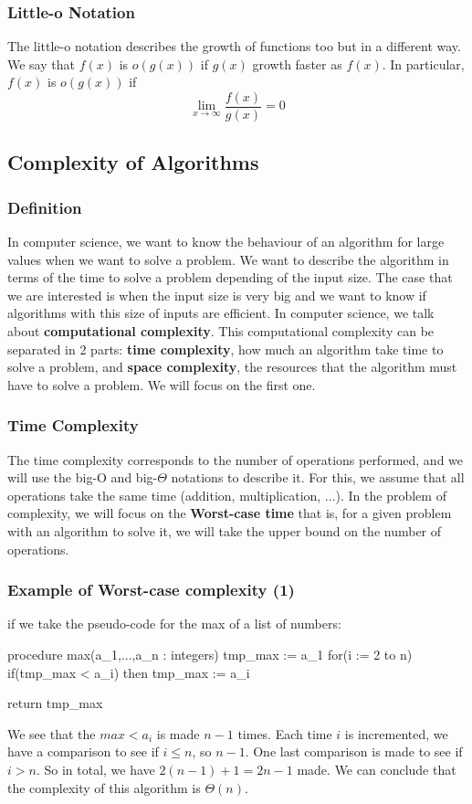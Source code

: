 \documentclass{article}
\begin{document}
\subsubsection{Little-o Notation} The little-o notation describes the growth of functions too but in a different way. We say that $ f(x) $ is $ o(g(x)) $ if $ g(x) $ growth faster as $ f(x) $. In particular, $ f(x) $ is $ o(g(x)) $ if
\begin{equation}
\lim_{x \rightarrow \infty}\frac{f(x)}{g(x)} = 0
\end{equation}

\subsection{Complexity of Algorithms}
\subsubsection{Definition} In computer science, we want to know the behaviour of an algorithm for large values when we want to solve a problem. We want to describe the algorithm in terms of the time to solve a problem depending of the input size. The case that we are interested is when the input size is very big and we want to know if algorithms with this size of inputs are efficient. In computer science, we talk about \textbf{computational complexity}. This computational complexity can be separated in 2 parts: \textbf{time complexity}, how much an algorithm take time to solve a problem, and \textbf{space complexity}, the resources that the algorithm must have to solve a problem. We will focus on the first one.

\subsubsection{Time Complexity} The time complexity corresponds to the number of operations performed, and we will use the big-O and big-$ \Theta $ notations to describe it. For this, we assume that all operations take the same time (addition, multiplication, ...). In the problem of complexity, we will focus on the \textbf{Worst-case time} that is, for a given problem with an algorithm to solve it, we will take the upper bound on the number of operations.

\subsubsection{Example of Worst-case complexity (1)} if we take the pseudo-code for the max of a list of numbers:
\begin{mylisting}
	procedure max(a_1,...,a_n : integers)
		tmp_max := a_1
		for(i := 2 to n)
			if(tmp_max < a_i) then tmp_max := a_i
			
		return tmp_max
\end{mylisting}
We see that the $ max < a_i $ is made $ n - 1 $ times. Each time $ i $ is incremented, we have a comparison to see if $ i \leq n $, so $ n - 1 $. One last comparison is made to see if $ i > n $. So in total, we have $ 2(n - 1) + 1 = 2n - 1 $ made. We can conclude that the complexity of this algorithm is $ \Theta(n) $.
\end{document}
